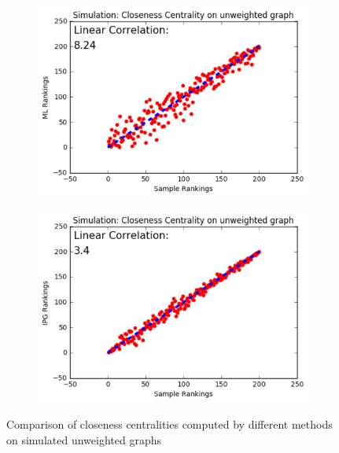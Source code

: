 \documentclass[9pt]{beamer}
\begin{document}
\begin{frame}
\begin{figure}[H]
\begin{subfigure}{.32\textwidth}
    \includegraphics[width=0.95\linewidth]{CCU_ML.jpeg}
\end{subfigure}
\begin{subfigure}{.32\textwidth}
	\centering
    \includegraphics[width=0.95\linewidth]{CCU_IPG.jpeg}
\end{subfigure}
\caption{Comparison of closeness centralities computed by different methods on simulated unweighted graphs}
\end{figure}
\end{frame}
\end{document}
